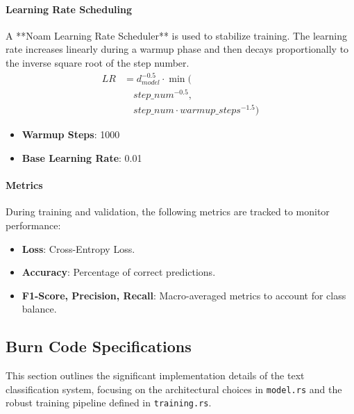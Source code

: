 \documentclass{ieeeaccess}
\begin{document}
\paragraph{Learning Rate Scheduling}
A **Noam Learning Rate Scheduler** is used to stabilize training. The learning rate increases linearly during a warmup phase and then decays proportionally to the inverse square root of the step number.
\begin{equation}
\begin{aligned}
LR &= d_{model}^{-0.5} \cdot \min( \\
   &\quad step\_num^{-0.5}, \\
   &\quad step\_num \cdot warmup\_steps^{-1.5}
)
\end{aligned}
\end{equation}
\begin{itemize}
    \item \textbf{Warmup Steps}: 1000
    \item \textbf{Base Learning Rate}: 0.01
\end{itemize}

\paragraph{Metrics}
During training and validation, the following metrics are tracked to monitor performance:
\begin{itemize}
    \item \textbf{Loss}: Cross-Entropy Loss.
    \item \textbf{Accuracy}: Percentage of correct predictions.
    \item \textbf{F1-Score, Precision, Recall}: Macro-averaged metrics to account for class balance.
\end{itemize}

\subsection{Burn Code Specifications}

This section outlines the significant implementation details of the text classification system, focusing on the architectural choices in \texttt{model.rs} and the robust training pipeline defined in \texttt{training.rs}.
\end{document}
